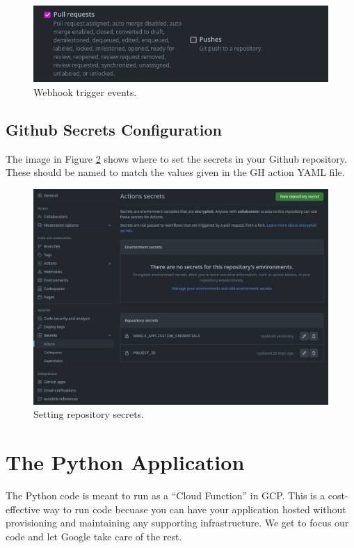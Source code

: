 \begin{figure}[ht]
	\includegraphics[width=12cm]{images/webhook2.png}
	\caption{Webhook trigger events.}
	\label{wh2}
\end{figure}
\vspace{2mm}

\subsection{\label{sec:gh_secrets}Github Secrets Configuration}

\justifying
The image in Figure \ref{gh_secrets} shows where to set the secrets in your Github repository. These should be named to match the values given in the GH action YAML file.
\vspace{2mm}

\begin{figure}[ht]
	\includegraphics[width=12cm]{images/gh_secrets.png}
	\caption{Setting repository secrets.}
	\label{gh_secrets}
\end{figure}
\vspace{2mm}

\section{\label{sec:Python} The Python Application}

\justifying
The Python code is meant to run as a ``Cloud Function'' in GCP. This is a cost-effective way to run code becuase you can have
your application hosted without provisioning and maintaining any supporting infrastructure. We get to focus our code and let Google
take care of the rest.

